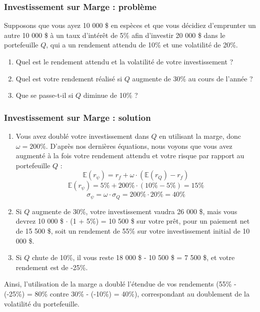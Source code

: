 \documentclass[a4paper, 12pt]{report}
\begin{document}
\subsubsection{Investissement sur Marge : problème}

Supposons que vous ayez 10 000 \$ en espèces et que vous décidiez d'emprunter un autre 10 000 \$ à un taux d'intérêt de 5\% afin d'investir 20 000 \$ dans le portefeuille \( Q \), qui a un rendement attendu de 10\% et une volatilité de 20\%.

\begin{enumerate}
	\item Quel est le rendement attendu et la volatilité de votre investissement ?
	\item Quel est votre rendement réalisé si \( Q \) augmente de 30\% au cours de l'année ?
	\item Que se passe-t-il si \( Q \) diminue de 10\% ?
\end{enumerate}
\subsubsection{Investissement sur Marge : solution}
\begin{enumerate}
	\item Vous avez doublé votre investissement dans \( Q \) en utilisant la marge, donc \( \omega = 200\% \). D'après nos dernières équations, nous voyons que vous avez augmenté à la fois votre rendement attendu et votre risque par rapport au portefeuille \( Q \) :
	\[
	\mathbb{E}(r_\psi) = r_f + \omega \cdot (\mathbb{E}(r_Q) - r_f) 
	\]
	\[
	\mathbb{E}(r_\psi) = 5\% + 200\% \cdot (10\% - 5\%) = 15\% 
	\]
	\[
	\sigma_\psi = \omega \cdot \sigma_Q = 200\% \cdot 20\% = 40\% 
	\]
	
	\item Si \( Q \) augmente de 30\%, votre investissement vaudra 26 000 \$, mais vous devrez 10 000 \$ $\cdot$ (1 + 5\%) = 10 500 \$ sur votre prêt, pour un paiement net de 15 500 \$, soit un rendement de 55\% sur votre investissement initial de 10 000 \$.
	
	\item Si \( Q \) chute de 10\%, il vous reste 18 000 \$ - 10 500 \$ = 7 500 \$, et votre rendement est de -25\%.
\end{enumerate}

Ainsi, l'utilisation de la marge a doublé l'étendue de vos rendements (55\% - (-25\%) = 80\% contre 30\% - (-10\%) = 40\%), correspondant au doublement de la volatilité du portefeuille.
\end{document}
